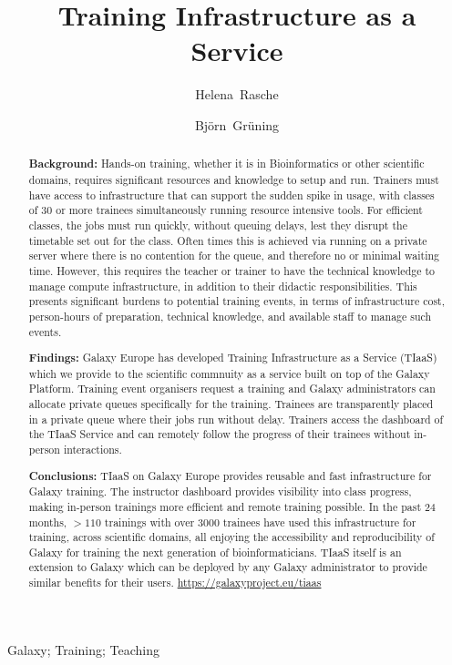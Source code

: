 \documentclass[a4paper,num-refs]{oup-contemporary}
\title{Training Infrastructure as a Service}
\author[1,\authfn{1},\authfn{2}]{Helena~Rasche}
\author[2,\authfn{2}]{Bj\"orn~Gr\"uning}
\affil[1]{Bioinformatics Group, Department of Computer Science, University of Freiburg, 79110 Freiburg im Breisgau, Germany}
\begin{document}
\begin{frontmatter}
\maketitle
\begin{abstract}
\textbf{Background:} Hands-on training, whether it is in Bioinformatics or other scientific domains, requires significant resources and knowledge to setup and run.
Trainers must have access to infrastructure that can support the sudden spike in usage, with classes of 30 or more trainees simultaneously running resource intensive tools.
For efficient classes, the jobs must run quickly, without queuing delays, lest they disrupt the timetable set out for the class. Often times this is achieved via running on a private server where there is no contention for the queue, and therefore no or minimal waiting time. However, this requires the teacher or trainer to have the technical knowledge to manage compute infrastructure, in addition to their didactic responsibilities. This presents significant burdens to potential training events, in terms of infrastructure cost, person-hours of preparation, technical knowledge, and available staff to manage such events.

\textbf{Findings:} Galaxy Europe has developed Training Infrastructure as a Service (TIaaS) which we provide to the scientific commnuity as a service built on top of the Galaxy Platform. Training event organisers request a training and Galaxy administrators can allocate private queues specifically for the training. Trainees are transparently placed in a private queue where their jobs run without delay. Trainers access the dashboard of the TIaaS Service and can remotely follow the progress of their trainees without in-person interactions.

\textbf{Conclusions:} TIaaS on Galaxy Europe provides reusable and fast infrastructure for Galaxy training. The instructor dashboard provides visibility into class progress, making in-person trainings more efficient and remote training possible. In the past 24 months, $>110$ trainings with over 3000 trainees have used this infrastructure for training, across scientific domains, all enjoying the accessibility and reproducibility of Galaxy for training the next generation of bioinformaticians. TIaaS itself is an extension to Galaxy which can be deployed by any Galaxy administrator to provide similar benefits for their users. \url{https://galaxyproject.eu/tiaas}
\end{abstract}

\begin{keywords}
Galaxy; Training; Teaching
\end{keywords}
\end{frontmatter}
\end{document}
